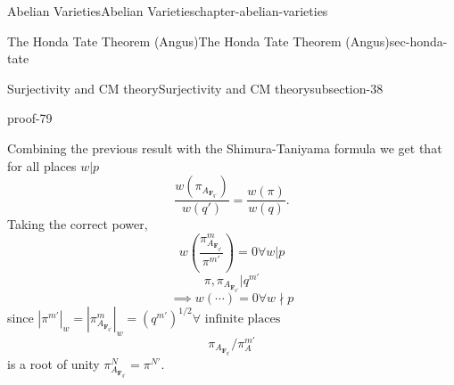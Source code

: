 \documentclass[oneside,10pt,]{book}
\numberwithin{equation}{section}
\newcommand{\FF}{\mathbf{F}}
\begin{document}
\begin{chapterptx}{Abelian Varieties}{}{Abelian Varieties}{}{}{chapter-abelian-varieties}
\begin{sectionptx}{The Honda Tate Theorem (Angus)}{}{The Honda Tate Theorem (Angus)}{}{}{sec-honda-tate}
\begin{subsectionptx}{Surjectivity and CM theory}{}{Surjectivity and CM theory}{}{}{subsection-38}
\begin{proofptx}{}{proof-79}
\end{proofptx}
\hypertarget{p-455}{}%
Combining the previous result with the Shimura-Taniyama formula we get that for all places \(w|p\)%
\begin{equation*}
\frac{w(\pi_{A_{\FF_{q'}}})}{w(q')} = \frac{w(\pi)}{w(q)}\text{.}
\end{equation*}
Taking the correct power,%
\begin{equation*}
w\left( \frac {\pi^m_{A_{\FF_{q'}}}}{\pi^{m'}}\right) = 0 \forall w|p
\end{equation*}
%
\begin{equation*}
\pi,\pi_{A_{\FF_{q'}}}|q^{m'}
\end{equation*}
%
\begin{equation*}
\implies w(\cdots) = 0 \forall w \nmid p
\end{equation*}
since \(|\pi^{m'}|_w = |\pi_{A_{\FF_{q'}}}^m|_w = (q^{m'})^{1/2} \forall \text{ infinite places}\)%
\begin{equation*}
\pi_{A_{\FF_{q'}}}/ \pi_A^{m'}
\end{equation*}
is a root of unity \(\pi^N_{A_{\FF_{q'}}} = \pi^{N'}\).%
\end{subsectionptx}
\end{sectionptx}
\end{chapterptx}
%
%
\typeout{************************************************}
\typeout{************************************************}
%
\end{document}
